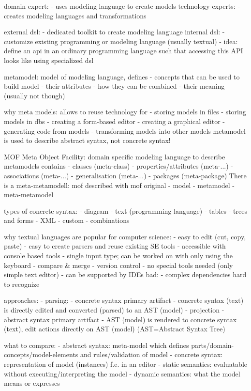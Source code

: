domain expert:
- uses modeling language to create models
technology experts:
- creates modeling languages and transformations

external dsl:
- dedicated toolkit to create modeling language
internal dsl:
- customize existing programming or modeling language (usually textual)
- idea: define an api in an ordinary programming language such that accessing this API looks like using specialized dsl

metamodel: model of modeling language, defines
- concepts that can be used to build model
- their attributes
- how they can be combined
- their meaning (usually not though)

why meta models: allows to reuse technology for
- storing models in files
- storing models in dbs
- creating a form-based editor
- creating a graphical editor
- generating code from models
- transforming models into other models
metamodel is used to describe abstract syntax, not concrete syntax!

MOF Meta Object Facility: domain specific modeling language to describe metamodels
contains
- classes (meta-class)
- properties/attributes (meta-...)
- associations (meta-...)
- generalisation (meta-...)
- packages (meta-package)
There is a meta-metamodell: mof described with mof
original - model - metamodel - meta-metamodel

types of concrete syntax:
- diagram
- text (programming language)
- tables
- trees and forms
- XML
- custom
- combinations

why textual languages are popular for computer science:
- easy to edit (cut, copy, paste)
- easy to create parsers and reuse existing SE tools
- accessible with console based tools
- single input type; can be worked on with only using the keyboard
- compare & merge
- version control
- no special tools needed (only simple text editor)
- can be supported by IDEs
bad:
- complex dependencies hard to recognize

approaches:
- parsing:
  - concrete syntax primary artifact
  - concrete syntax (text) is directly edited and converted (parsed) to an AST (model)
- projection
  - abstract syntax primary artifact
  - AST (model) is rendered to concrete syntax (text), edit actions directly on AST (model) (AST=Abstract Syntax Tree)

what to compare:
- abstract syntax: meta-model which defines parts/domain-concepts/model-elements and rules/validation of model
- concrete syntax: representation of model (instances) f.e. in an editor
- static semantics: evaluatable without executing/interpreting the model
- dynamic semantics: what the model means or expresses

